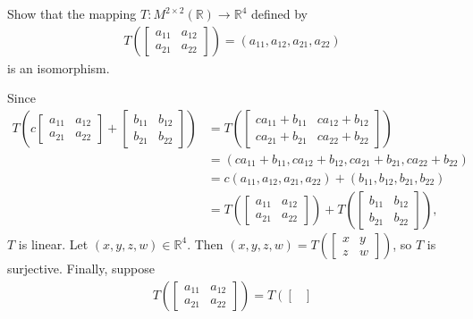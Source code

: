 \documentclass[12pt,letterpaper,reqno]{article}
\numberwithin{equation}{section}
\newcommand{\R}{\ensuremath{\mathbb R}}
\begin{document}
\begin{exercise}
Show that the mapping $T:M^{2 \times 2}(\R) \to \R^4$ defined by
\begin{align*}
	T\left(\begin{bmatrix}
		a_{11} & a_{12} \\
		a_{21} & a_{22}
	\end{bmatrix}\right)=(a_{11},a_{12},a_{21},a_{22})
\end{align*}	
is an isomorphism.
\end{exercise}

{\color{red}
\begin{solution}
Since
\begin{align*}
	T\left(c\begin{bmatrix}
		a_{11} & a_{12} \\
		a_{21} & a_{22}
	\end{bmatrix}+\begin{bmatrix}
		b_{11} & b_{12} \\
		b_{21} & b_{22}
	\end{bmatrix}\right)&=T\left(\begin{bmatrix}
		ca_{11}+b_{11} & ca_{12}+b_{12} \\
		ca_{21}+b_{21} & ca_{22}+b_{22}\end{bmatrix}\right)\\
		&=(ca_{11}+b_{11}, ca_{12}+b_{12}, ca_{21}+b_{21}, ca_{22}+b_{22}) \\
		&=c(a_{11}, a_{12}, a_{21}, a_{22})+(b_{11}, b_{12}, b_{21}, b_{22}) \\
		&=T\left(\begin{bmatrix}
		a_{11} & a_{12} \\
		a_{21} & a_{22}
	\end{bmatrix}\right)+T\left(\begin{bmatrix}
		b_{11} & b_{12} \\
		b_{21} & b_{22}
	\end{bmatrix}\right),
\end{align*}	
$T$ is linear. Let $(x,y,z,w) \in \R^4$. Then $(x,y,z,w)=T\left(\begin{bmatrix}
	x & y \\
	z & w
\end{bmatrix}\right)$, so $T$ is surjective. Finally, suppose
\begin{align*}
	T\left(\begin{bmatrix}
	a_{11} & a_{12} \\
	a_{21} & a_{22}
\end{bmatrix}\right)=T\left(\begin{bmatrix}

\end{bmatrix}
\end{align*}
\end{solution}}
\end{document}
